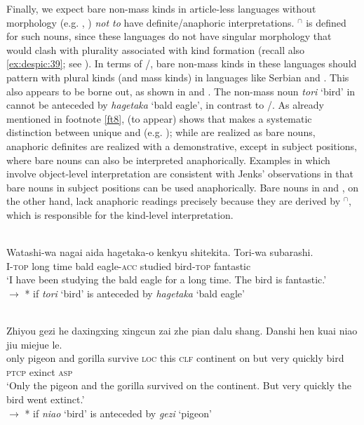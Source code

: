 \documentclass[output=paper,
modfonts
]{langscibook}
\begin{document}
	Finally, we expect bare non-mass kinds in article-less languages without  morphology (e.g. , ) \textit{not to} have definite/anaphoric interpretations. $^\cap$ is defined for such nouns, since these languages do not have singular morphology that would clash with plurality associated with kind formation (recall also \ref{ex:despic:39}; see \citealt[411-413]{Dayal2004}). In terms of /, bare non-mass kinds in these languages should pattern with plural kinds (and mass kinds) in languages like Serbian and . This also appears to be borne out, as shown in  and . The non-mass noun \textit{tori} `bird' in  cannot be anteceded by \textit{hagetaka} `bald eagle', in contrast to /.
	As already mentioned in footnote \ref{ft8}, \citeauthor{Jenkstoappear} (to appear) shows that  makes a systematic distinction between unique and  (e.g. \citealt{Schwarz2009}); while  are realized as bare nouns, anaphoric definites are realized with a demonstrative, except in subject positions, where bare nouns can also be interpreted anaphorically. Examples in  which involve object-level interpretation are consistent with Jenks' observations in that bare nouns in subject positions can be used anaphorically. Bare nouns in  and , on the other hand, lack anaphoric readings precisely because they are derived by $^\cap$, which is responsible for the kind-level interpretation. 
	
	\ea \label{ex:despic:52} 
	 \\
	\gll 
	{Watashi}-{wa} {nagai} {aida} {hagetaka-o} {kenkyu shitekita}. {Tori}-{wa} {subarashi}. \\
	I-\textsc{top} long time {bald eagle-\textsc{acc}} studied bird-\textsc{top} fantastic \\ 
	\glt `I have been studying the bald eagle for a long time. The bird is fantastic.' \\
	$\rightarrow$ * if \textit{tori} `bird' is anteceded by \textit{hagetaka} `bald eagle'
	\z 
	
	
	\ea \label{ex:despic:53}
	 \\
	\gll 
	{Zhiyou} {gezi} {he} {daxingxing} {xingcun} {zai} {zhe} {pian} {dalu} {shang}. {Danshi} {hen} {kuai} {niao} {jiu} {miejue} {le.} \\
	only pigeon and gorilla survive \textsc{loc} this \textsc{clf} continent on but very quickly bird \textsc{ptcp} exinct \textsc{asp} \\
	\glt `Only the pigeon and the gorilla survived on the continent. But very quickly the bird went extinct.' \\
	$\rightarrow$ * if \textit{niao} `bird' is anteceded by \textit{gezi} `pigeon'
	\z 
	
\end{document}
